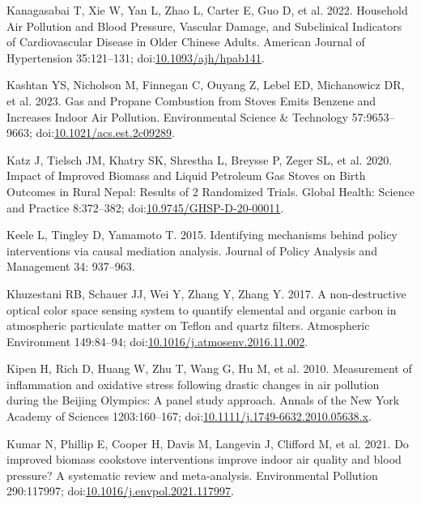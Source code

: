 \documentclass[
  letterpaper,
  DIV=11,
  numbers=noendperiod]{scrartcl}
\newlength{\cslhangindent}
\newenvironment{CSLReferences}[2] %
 {\begin{list}{}{%
  \setlength{\itemindent}{0pt}
  \setlength{\leftmargin}{0pt}
  \setlength{\parsep}{0pt}
  \ifodd #1
   \setlength{\leftmargin}{\cslhangindent}
   \setlength{\itemindent}{-1\cslhangindent}
  \fi
  \setlength{\itemsep}{#2\baselineskip}}}
 {\end{list}}
\begin{document}
\begin{CSLReferences}{1}{1}
Kanagasabai T, Xie W, Yan L, Zhao L, Carter E, Guo D, et al. 2022.
Household {Air Pollution} and {Blood Pressure}, {Vascular Damage}, and
{Subclinical Indicators} of {Cardiovascular Disease} in {Older Chinese
Adults}. American Journal of Hypertension 35:121--131;
doi:\href{https://doi.org/10.1093/ajh/hpab141}{10.1093/ajh/hpab141}.

Kashtan YS, Nicholson M, Finnegan C, Ouyang Z, Lebel ED, Michanowicz DR,
et al. 2023. Gas and {Propane Combustion} from {Stoves Emits Benzene}
and {Increases Indoor Air Pollution}. Environmental Science \&
Technology 57:9653--9663;
doi:\href{https://doi.org/10.1021/acs.est.2c09289}{10.1021/acs.est.2c09289}.

Katz J, Tielsch JM, Khatry SK, Shrestha L, Breysse P, Zeger SL, et al.
2020. Impact of {Improved Biomass} and {Liquid Petroleum Gas Stoves} on
{Birth Outcomes} in {Rural Nepal}: {Results} of 2 {Randomized Trials}.
Global Health: Science and Practice 8:372--382;
doi:\href{https://doi.org/10.9745/GHSP-D-20-00011}{10.9745/GHSP-D-20-00011}.

Keele L, Tingley D, Yamamoto T. 2015. Identifying mechanisms behind
policy interventions via causal mediation analysis. Journal of Policy
Analysis and Management 34: 937--963.

Khuzestani RB, Schauer JJ, Wei Y, Zhang Y, Zhang Y. 2017. A
non-destructive optical color space sensing system to quantify elemental
and organic carbon in atmospheric particulate matter on {Teflon} and
quartz filters. Atmospheric Environment 149:84--94;
doi:\href{https://doi.org/10.1016/j.atmosenv.2016.11.002}{10.1016/j.atmosenv.2016.11.002}.

Kipen H, Rich D, Huang W, Zhu T, Wang G, Hu M, et al. 2010. Measurement
of inflammation and oxidative stress following drastic changes in air
pollution during the {Beijing Olympics}: A panel study approach. Annals
of the New York Academy of Sciences 1203:160--167;
doi:\href{https://doi.org/10.1111/j.1749-6632.2010.05638.x}{10.1111/j.1749-6632.2010.05638.x}.

Kumar N, Phillip E, Cooper H, Davis M, Langevin J, Clifford M, et al.
2021. Do improved biomass cookstove interventions improve indoor air
quality and blood pressure? {A} systematic review and meta-analysis.
Environmental Pollution 290:117997;
doi:\href{https://doi.org/10.1016/j.envpol.2021.117997}{10.1016/j.envpol.2021.117997}.


\end{CSLReferences}
\end{document}
